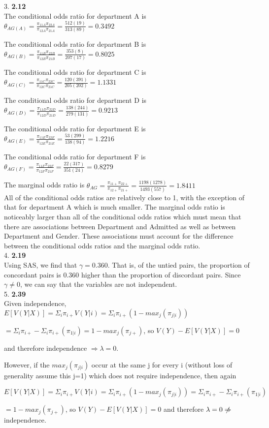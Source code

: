 \documentclass{article}
\begin{document}
3. \textbf{2.12}\\

The conditional odds ratio for department A is $\theta_{AG(A)} = \frac{\pi_{11A}\pi_{22A}}{\pi_{12A}\pi_{21A}} = \frac{512(19)}{313(89)} = 0.3492$

The conditional odds ratio for department B is $\theta_{AG(B)} = \frac{\pi_{11B}\pi_{22B}}{\pi_{12B}\pi_{21B}} = \frac{353(8)}{207(17)} = 0.8025$

The conditional odds ratio for department C is $\theta_{AG(C)} = \frac{\pi_{11C}\pi_{22C}}{\pi_{12C}\pi_{21C}} = \frac{120(391)}{205(202)} = 1.1331$

The conditional odds ratio for department D is $\theta_{AG(D)} = \frac{\pi_{11D}\pi_{22D}}{\pi_{12D}\pi_{21D}} = \frac{138(244)}{279(131)} = 0.9213$

The conditional odds ratio for department E is $\theta_{AG(E)} = \frac{\pi_{11E}\pi_{22E}}{\pi_{12E}\pi_{21E}} = \frac{53(299)}{138(94)} = 1.2216$

The conditional odds ratio for department F is $\theta_{AG(F)} = \frac{\pi_{11F}\pi_{22F}}{\pi_{12F}\pi_{21F}} = \frac{22(317)}{351(24)} = 0.8279$

The marginal odds ratio is $\theta_{AG} = \frac{\pi_{11+}\pi_{22+}}{\pi_{12+}\pi_{21+}} = \frac{1198(1278)}{1493(557)} = 1.8411$
\\

All of the conditional odds ratios are relatively close to 1, with the exception of that for department A which is much smaller. The marginal odds ratio is noticeably larger than all of the conditional odds ratios which must mean that there are associations between Department and Admitted as well as between Department and Gender. These associations must account for the difference between the conditional odds ratios and the marginal odds ratio.
\\

4. \textbf{2.19}\\

Using SAS, we find that $\gamma = 0.360$. That is, of the untied pairs, the proportion of concordant pairs is 0.360 higher than the proportion of discordant pairs. Since $\gamma \neq 0$, we can say that the variables are not independent.
\\

5. \textbf{2.39}\\

Given independence, $E[V(Y|X)] = \Sigma_i \pi_{i+}V(Y|i) = \Sigma_i \pi_{i+}(1-max_j(\pi_{j|i}))$

$= \Sigma_i \pi_{i+} - \Sigma_i \pi_{i+}(\pi_{1|i}) = 1 - max_j(\pi_{j+})$, so $V(Y) - E[V(Y|X)] = 0$ 

and therefore independence $\Rightarrow \lambda = 0$.

However, if the $max_j(\pi_{j|i})$ occur at the same j for every i (without loss of generality assume this j=1) which does not require independence, then again 

$E[V(Y|X)] = \Sigma_i \pi_{i+}V(Y|i) = \Sigma_i \pi_{i+}(1-max_j(\pi_{j|i})) = \Sigma_i \pi_{i+} - \Sigma_i \pi_{i+}(\pi_{1|i})$

$= 1 - max_j(\pi_{j+})$, so $V(Y) - E[V(Y|X)] = 0$ and therefore $\lambda = 0 \centernot\Rightarrow$ independence.
\end{document}
